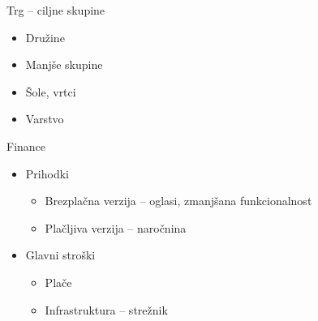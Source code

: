 \documentclass[10pt]{beamer}
\begin{document}
\begin{frame}{Trg -- ciljne skupine}
    \begin{itemize}
        \item Družine
        \item Manjše skupine
        \item Šole, vrtci
        \item Varstvo
    \end{itemize}
\end{frame}

\begin{frame}{Finance}
    \begin{itemize}
        \item Prihodki
        \begin{itemize}
            \item Brezplačna verzija -- oglasi, zmanjšana funkcionalnost
            \item Plačljiva verzija -- naročnina
        \end{itemize}
        \item Glavni stroški
        \begin{itemize}
            \item Plače
            \item Infrastruktura -- strežnik
        \end{itemize}
    \end{itemize}
\end{frame}
\end{document}
